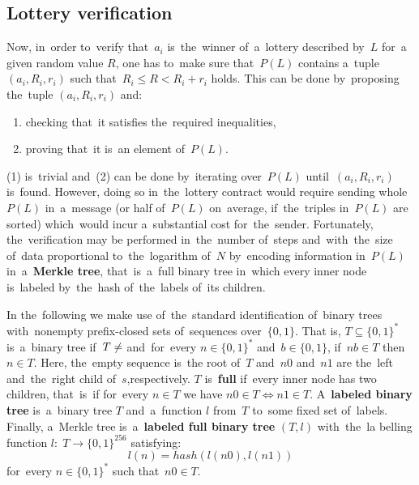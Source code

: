 \documentclass[a4paper]{article}
\begin{document}
\subsection{Lottery verification}
    \label{sec:lottery-verification}
    Now, in~order to~verify that~$a_i$ is~the~winner of~a~lottery described by~$L$ for~a given random value $R$,
    one has to~make sure that~$P(L)$ contains a~tuple $(a_i, R_i, r_i)$ such that~$R_i \leq R < R_i + r_i$ holds.
    This can be done by~proposing the~tuple $(a_i, R_i, r_i)$ and:
    \begin{enumerate}
        \item checking that~it satisfies the~required inequalities,
        \item proving that~it is~an element of~$P(L)$.
    \end{enumerate}

    (1) is~trivial and~(2) can be done by~iterating over~$P(L)$ until~$(a_i, R_i, r_i)$ is~found. However,
    doing so in~the~lottery contract would require sending whole $P(L)$ in~a~message (or half of~$P(L)$ on~average,
    if~the~triples in~$P(L)$ are sorted) which~would incur a~substantial cost for~the~sender. Fortunately,
    the~verification may be performed in~the~number of~steps and~with~the~size of~data proportional to~the~logarithm
    of~$N$ by~encoding information in~$P(L)$ in~a~\textbf{Merkle tree}, that~is~a~full binary tree in~which every inner node
    is~labeled by~the~hash of~the~labels of~its children.

    In the~following we make use of~the~standard identification of~binary trees with~nonempty prefix-closed sets
    of~sequences over~$\{0,1\}$. That is, $T \subseteq \{0,1\}^*$ is~a~binary tree if~$T \neq \empty$ and~for~every
    $n \in \{0,1\}^*$ and~$b \in \{0,1\}$, if~$nb \in T$ then $n \in T$. Here, the~empty sequence is~the
    root of~$T$ and~$n0$ and~$n1$ are the~left and~the~right child of~$s$,respectively.
    $T$ is~\textbf{full} if~every inner node has two children, that~is~if for~every $n \in T$ we have $n0 \in T \iff n1 \in T$.
    A~\textbf{labeled binary tree} is~a~binary tree $T$ and~a~function $l$ from~$T$ to~some fixed set of~labels.
    Finally, a~Merkle tree is~a~\textbf{labeled full binary tree} $(T, l)$ with~the~la belling function
    $l:\; T \rightarrow \{0,1\}^{256}$ satisfying:
    \begin{displaymath}
        l(n) = hash(l(n0), l(n1))
    \end{displaymath}
    for~every $n \in \{0,1\}^*$ such that~$n0 \in T$.
\end{document}
